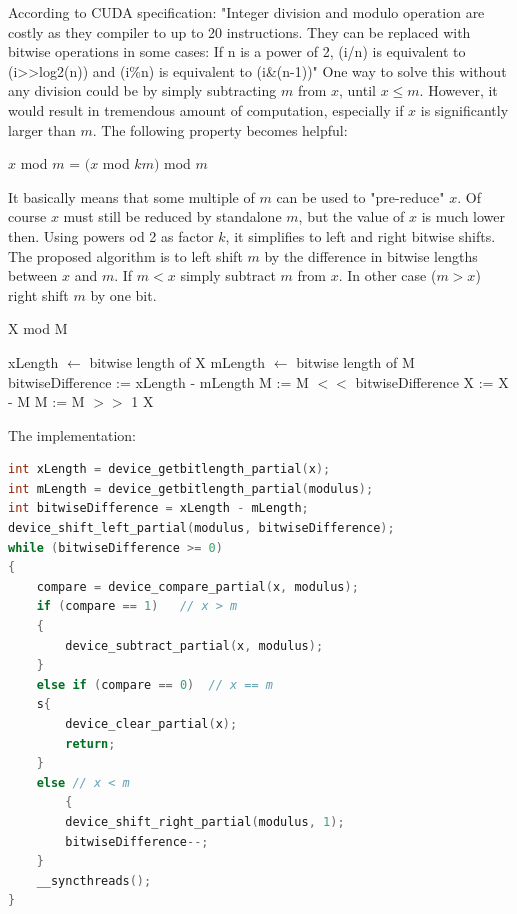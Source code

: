 \documentclass[oneside,openright,12pt,final,en]{mgr}
\begin{document}
According to CUDA specification\cite{ndoc}:
"Integer division and modulo operation are costly as they compiler to up to 20 instructions. They can be replaced with bitwise operations in some cases: If n is a power of 2, (i/n) is equivalent to (i>>log2(n)) and (i\%n) is equivalent to (i\&(n-1))" One way to solve this without any division could be by simply subtracting $m$ from $x$, until $x\leq m$. However, it would result in tremendous amount of computation, especially if $x$ is significantly larger than $m$. 
The following property becomes helpful:
\begin{center}
	$x$ mod $m$ = $(x$ mod $km)$ mod $m$
\end{center}
It basically means that some multiple of $m$ can be used to "pre-reduce" $x$. Of course $x$ must still be reduced by standalone $m$, but the value of $x$ is much lower then. Using powers od 2 as factor $k$, it simplifies to left and right bitwise shifts. The proposed algorithm is to left shift $m$ by the difference in bitwise lengths between $x$ and $m$. If $m < x$ simply subtract $m$ from $x$. In other case ($m > x$) right shift $m$ by one bit.

\begin{algorithm}
	\caption{X mod M}\label{euclid}
	\begin{algorithmic}[1]
		\State xLength $\gets$ bitwise length of X
		\State mLength $\gets$ bitwise length of M
		\State bitwiseDifference := xLength - mLength
		\State M := M $<<$ bitwiseDifference
					\State X := X - M
				\Else
					\State M := M $>>$ 1
				\EndIf		
		\EndWhile
		\State
		\Return X 
	\end{algorithmic}
\end{algorithm}
The implementation:
 \begin{lstlisting}[language=cpp]
int xLength = device_getbitlength_partial(x);
int mLength = device_getbitlength_partial(modulus);
int bitwiseDifference = xLength - mLength;
device_shift_left_partial(modulus, bitwiseDifference);
while (bitwiseDifference >= 0)
{
	compare = device_compare_partial(x, modulus);
	if (compare == 1)	// x > m
	{
		device_subtract_partial(x, modulus);
	}
	else if (compare == 0)  // x == m	
	s{
		device_clear_partial(x);
		return;
	}
	else // x < m
		{
		device_shift_right_partial(modulus, 1);
		bitwiseDifference--;
	}
	__syncthreads();
}
 \end{lstlisting}
\end{document}
